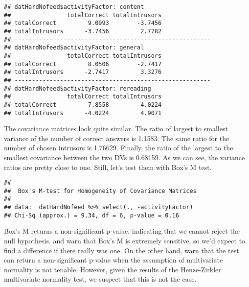 \documentclass[12pt,]{article}
\newenvironment{Shaded}{\begin{snugshade}}{\end{snugshade}}
\newcommand{\DataTypeTok}[1]{\textcolor[rgb]{0.13,0.29,0.53}{#1}}
\newcommand{\KeywordTok}[1]{\textcolor[rgb]{0.13,0.29,0.53}{\textbf{#1}}}
\newcommand{\NormalTok}[1]{#1}
\newcommand{\OperatorTok}[1]{\textcolor[rgb]{0.81,0.36,0.00}{\textbf{#1}}}
\newcommand{\StringTok}[1]{\textcolor[rgb]{0.31,0.60,0.02}{#1}}
\begin{document}
\begin{verbatim}
## datHardNofeed$activityFactor: content
##                totalCorrect totalIntrusors
## totalCorrect         9.0993        -3.7456
## totalIntrusors      -3.7456         2.7782
## -------------------------------------------------------- 
## datHardNofeed$activityFactor: general
##                totalCorrect totalIntrusors
## totalCorrect         8.0506        -2.7417
## totalIntrusors      -2.7417         3.3276
## -------------------------------------------------------- 
## datHardNofeed$activityFactor: rereading
##                totalCorrect totalIntrusors
## totalCorrect         7.8558        -4.0224
## totalIntrusors      -4.0224         4.9071
\end{verbatim}

The covariance matrices look quite similar. The ratio of largest to
smallest variance of the number of correct answers is 1.1583. The same
ratio for the number of chosen intrusors is 1.76629. Finally, the ratio
of the largest to the smallest covariance between the two DVs is
0.68159. As we can see, the variance ratios are pretty close to one.
Still, let's test them with Box's M test.

\begin{Shaded}
\end{Shaded}

\begin{verbatim}
## 
##  Box's M-test for Homogeneity of Covariance Matrices
## 
## data:  datHardNofeed %>% select(., -activityFactor)
## Chi-Sq (approx.) = 9.34, df = 6, p-value = 0.16
\end{verbatim}

Box's M returns a non-significant p-value, indicating that we cannot
reject the null hypothesis. \citet{field_discovering_2012} and
\citet{raykov_introduction_2008} warn that Box's M is extremely
sensitive, so we'd expect to find a difference if there really was one.
On the other hand, \citet{field_discovering_2012} warn that the test can
return a non-significant p-value when the assumption of multivariate
normality is not tenable. However, given the results of the
Henze-Zirkler multivariate normality test, we suspect that this is not
the case.


{
    
}
\end{document}
